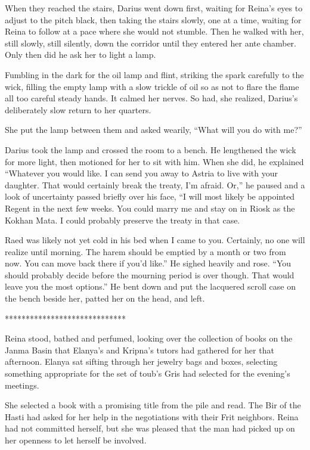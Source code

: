 \documentclass{article}
\begin{document}
	When they reached the stairs, Darius went down first, waiting for Reina’s eyes to adjust to the pitch black, then taking the stairs slowly, one at a time, waiting for Reina to follow at a pace where she would not stumble. Then he walked with her, still slowly, still silently, down the corridor until they entered her ante chamber. Only then did he ask her to light a lamp. 
	
	Fumbling in the dark for the oil lamp and flint, striking the spark carefully to the wick, filling the empty lamp with a slow trickle of oil so as not to flare the flame all too careful steady hands. It calmed her nerves. So had, she realized, Darius’s deliberately slow return to her quarters. 
	
	She put the lamp between them and asked wearily, “What will you do with me?”
	
	Darius took the lamp and crossed the room to a bench. He lengthened the wick for more light, then motioned for her to sit with him. When she did, he explained “Whatever you would like. I can send you away to Astria to live with your daughter. That would certainly break the treaty, I’m afraid. Or,” he paused and a look of uncertainty passed briefly over his face, “I will most likely be appointed Regent in the next few weeks. You could marry me and stay on in Riosk as the Kokhan Mata. I could probably preserve the treaty in that case. 
	
	Raed was likely not yet cold in his bed when I came to you. Certainly, no one will realize until morning.  The harem should be emptied by a month or two from now. You can move back there if you’d like.” He sighed heavily and rose. “You should probably decide before the mourning period is over though. That would leave you the most options.” He bent down and put the lacquered scroll case on the bench beside her, patted her on the head, and left.
	
	*****************************
	
	Reina stood, bathed and perfumed, looking over the collection of books on the Janma Basin that Elanya’s and Kripna’s tutors had gathered for her that afternoon. Elanya sat sifting through her jewelry bags and boxes, selecting something appropriate for the set of toub’s Gris had selected for the evening’s meetings. 
	
	She selected a book with a promising title from the pile and read. The Bir of the Hasti had asked for her help in the negotiations with their Frit neighbors. Reina had not committed herself, but she was pleased that the man had picked up on her openness to let herself be involved. 
	
\end{document}
